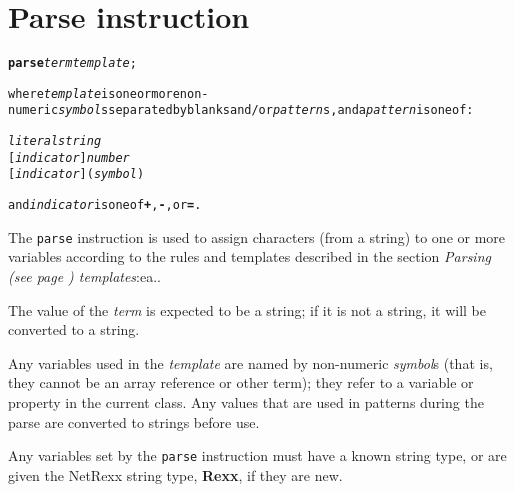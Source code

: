 \chapter{Parse instruction}\label{"id"}
\begin{shaded}
\begin{alltt}
\textbf{parse} \emph{term} \emph{template};

where \emph{template} is one or more non-numeric \emph{symbol}s separated by blanks and/or \emph{pattern}s, and a \emph{pattern} is one of:

    \emph{literalstring}
    [\emph{indicator}] \emph{number}
    [\emph{indicator}] (\emph{symbol})

and \emph{indicator} is one of \textbf{+}, \textbf{-}, or \textbf{=}.
\end{alltt}
\end{shaded}
 The \texttt{parse} instruction is used to assign characters (from a
string) to one or more variables according to the rules and templates
described in the section  \emph{Parsing (see page \pageref{refparsing}) 
templates}:ea..
 
The value of the \emph{term} is expected to be a string; if it is
not a string, it will be converted to a string.
 
Any variables used in the \emph{template} are named by non-numeric
\emph{symbol}s (that is, they cannot be an array reference or other
term); they refer to a variable or property in the current class.
Any values that are used in patterns during the parse are converted to
strings before use.
 
Any variables set by the \texttt{parse} instruction must have a known
string type, or are given the NetRexx string type, \textbf{Rexx}, if
they are new.
 
